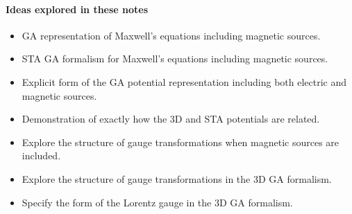 \paragraph{Ideas explored in these notes}

\begin{itemize}
\item GA representation of Maxwell's equations including magnetic sources.
\item STA GA formalism for Maxwell's equations including magnetic sources.
\item Explicit form of the GA potential representation including both electric and magnetic sources.
\item Demonstration of exactly how the 3D and STA potentials are related.
\item Explore the structure of gauge transformations when magnetic sources are included.
\item Explore the structure of gauge transformations in the 3D GA formalism.
\item Specify the form of the Lorentz gauge in the 3D GA formalism.
\end{itemize}
